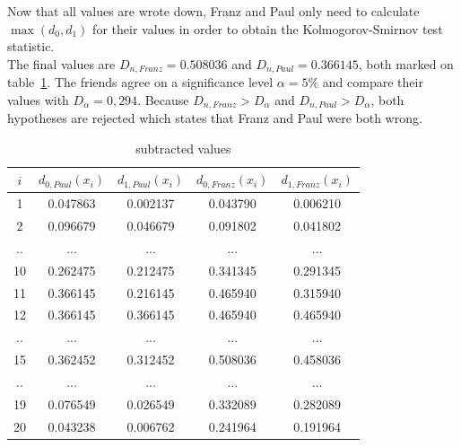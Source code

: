 \documentclass{article}
\theoremstyle{definition}
\begin{document}
Now that all values are wrote down, Franz and Paul only need to calculate $\max(d_0,d_1)$ for their values in order to obtain the Kolmogorov-Smirnov test statistic.\\
The final values are $D_{n,Franz}=0.508036$ and $D_{n,Paul}=0.366145$, both marked on table~\ref{tab:2}.
The friends agree on a significance level $\alpha = 5\%$ and compare their values with $D_\alpha=0,294$. Because $D_{n,Franz}>D_\alpha$ and $D_{n,Paul}>D_\alpha$, both hypotheses are rejected which states that Franz and Paul were both wrong.
\begin{table}[ht]
\caption{subtracted values}
\center
\begin{tabular}{c|c|c|c|c}
\label{tab:2}
$i$ 	& $d_{0,Paul}(x_i)$ 	& $d_{1,Paul}(x_i)$ 	& $d_{0,Franz}(x_i)$ 	& $d_{1,Franz}(x_i)$ 	\\
\hline
1	&	0.047863	&	0.002137	&	0.043790	&	0.006210	\\
2	&	0.096679	&	0.046679	&	0.091802	&	0.041802	\\
..	&	...		&	...		&	...		&	...		\\
10	&	0.262475	&	0.212475	&	0.341345	&	0.291345	\\
11	&	0.366145	&	0.216145	&	0.465940	&	0.315940	\\
12	&\cellcolor[gray]{0.9}	0.366145	&	0.366145	&	0.465940	&	0.465940	\\
..	&	...		&	...		&	...		&	...		\\
15	&	0.362452	&	0.312452	&\cellcolor[gray]{0.9}	0.508036	&	0.458036	\\
..	&	...		&	...		&	...		&	...		\\
19	&	0.076549	&	0.026549	&	0.332089	&	0.282089	\\
20	&	0.043238	&	0.006762	&	0.241964	&	0.191964	\\
\end{tabular}
\end{table}
\end{document}
